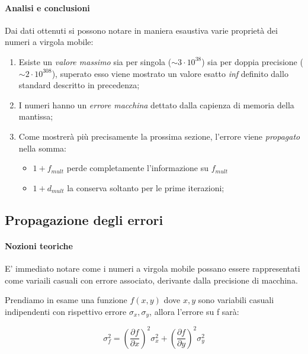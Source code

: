 \paragraph{Analisi e conclusioni}

Dai dati ottenuti si possono notare in maniera esaustiva varie proprietà dei
numeri a virgola mobile:

\begin{enumerate}
	\item Esiste un \textit{valore massimo} sia per singola ($\sim 3 \cdot 10^{38}$) sia
	      per doppia precisione ($\sim 2 \cdot 10^{308}$), superato esso viene mostrato un
	      valore esatto \textit{inf} definito dallo standard descritto in precedenza;

	\item I numeri hanno un \textit{errore macchina} dettato dalla capienza di memoria della mantissa;

	\item Come mostrerà più precisamente la prossima sezione, l’errore viene
	      \textit{propagato} nella somma:

	      \begin{itemize}
		      \item $1 + f_{mult}$ perde completamente l’informazione su $f_{mult}$

		      \item $1 + d_{mult}$ la conserva soltanto per le prime iterazioni;
	      \end{itemize}
\end{enumerate}
\subsection{Propagazione degli errori}
\paragraph{Nozioni teoriche}

E' immediato notare come i numeri a virgola mobile possano essere rappresentati come
variaili casuali con errore associato, derivante dalla precisione di macchina.

Prendiamo in esame una funzione $f(x, y)$ dove $x, y$ sono variabili casuali indipendenti
con rispettivo errore $\sigma_x, \sigma_y$, allora l'errore su f sarà:

$$
	\sigma_f^2 = {\left( \frac{\partial f}{\partial x} \right)^2 \sigma_x^2 + \left( \frac{\partial f}{\partial y} \right)^2 \sigma_y^2}
$$

